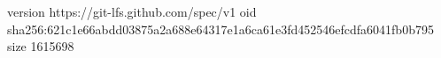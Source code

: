 version https://git-lfs.github.com/spec/v1
oid sha256:621c1e66abdd03875a2a688e64317e1a6ca61e3fd452546efcdfa6041fb0b795
size 1615698
